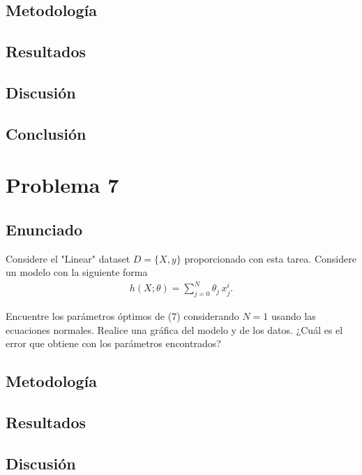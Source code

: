 \documentclass{article}
\begin{document}
\subsection{Metodología}

\subsection{Resultados}
\setcounter{equation}{0}

\subsection{Discusión}

\subsection{Conclusión}

\section{Problema 7}

\subsection{Enunciado}

Considere el "Linear" dataset $D=\{X, y\}$ proporcionado con esta tarea. Considere un modelo con la siguiente forma
\begin{align} \tag{7}
h(X;\theta) = \sum_{j=0}^{N} \theta_j\, x^{i}_{j}.
\end{align}

Encuentre los parámetros óptimos de (7) considerando $N=1$ usando las ecuaciones normales. Realice una gráfica del modelo y de los datos. ¿Cuál es el error que obtiene con los parámetros encontrados?

\subsection{Metodología}

\subsection{Resultados}
\setcounter{equation}{0}

\subsection{Discusión}
\end{document}
